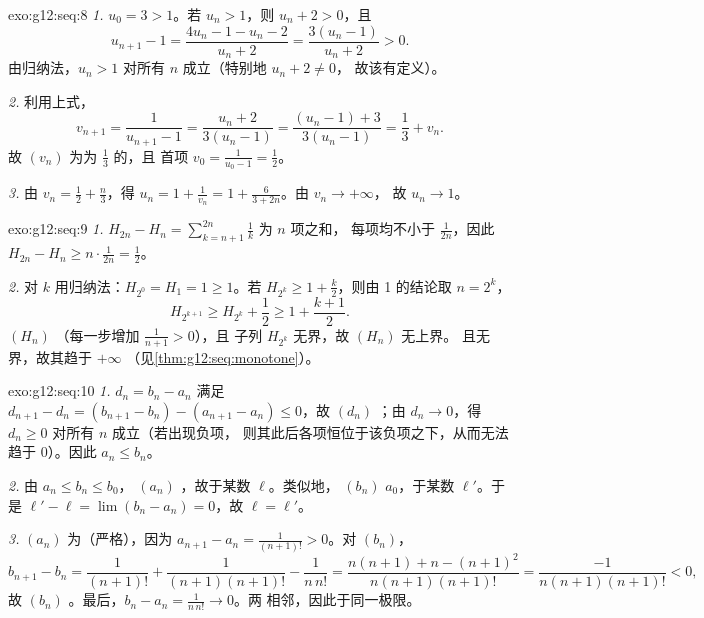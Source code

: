 \begin{solution}{exo:g12:seq:8}
\emph{1.} $u_0 = 3 > 1$。若 $u_n > 1$，则 $u_n + 2 > 0$，且
\[
u_{n+1} - 1 = \frac{4u_n - 1 - u_n - 2}{u_n + 2} = \frac{3(u_n - 1)}{u_n + 2} > 0 .
\]
由归纳法，$u_n > 1$ 对所有 $n$ 成立（特别地 $u_n + 2 \neq 0$，
故该有定义）。

\emph{2.} 利用上式，
\[
v_{n+1} = \frac{1}{u_{n+1} - 1} = \frac{u_n + 2}{3(u_n - 1)}
= \frac{(u_n - 1) + 3}{3(u_n - 1)} = \frac{1}{3} + v_n .
\]
故 $(v_n)$ 为为 $\frac13$ 的，且
首项 $v_0 = \frac{1}{u_0 - 1} = \frac12$。

\emph{3.} 由 $v_n = \frac12 + \frac{n}{3}$，得
$u_n = 1 + \frac{1}{v_n} = 1 + \frac{6}{3 + 2n}$。由 $v_n \to +\infty$，
故 $u_n \to 1$。
\end{solution}

\begin{solution}{exo:g12:seq:9}
\emph{1.} $H_{2n} - H_n = \sum_{k=n+1}^{2n} \frac{1}{k}$ 为 $n$ 项之和，
每项均不小于 $\frac{1}{2n}$，因此
$H_{2n} - H_n \geq n \cdot \frac{1}{2n} = \frac12$。

\emph{2.} 对 $k$ 用归纳法：$H_{2^0} = H_1 = 1 \geq 1$。若
$H_{2^k} \geq 1 + \frac{k}{2}$，则由 1 的结论取 $n = 2^k$，
\[
H_{2^{k+1}} \geq H_{2^k} + \frac12 \geq 1 + \frac{k+1}{2}.
\]
 $(H_n)$ （每一步增加 $\frac{1}{n+1} > 0$），且
子列 $H_{2^k}$ 无界，故 $(H_n)$ 无上界。
且无界，故其趋于 $+\infty$
（见\cref{thm:g12:seq:monotone}）。
\end{solution}

\begin{solution}{exo:g12:seq:10}
\emph{1.}  $d_n = b_n - a_n$ 满足
$d_{n+1} - d_n = (b_{n+1} - b_n) - (a_{n+1} - a_n) \leq 0$，故 $(d_n)$
；由 $d_n \to 0$，得 $d_n \geq 0$ 对所有 $n$ 成立（若出现负项，
则其此后各项恒位于该负项之下，从而无法
趋于 $0$）。因此 $a_n \leq b_n$。

\emph{2.} 由 $a_n \leq b_n \leq b_0$， $(a_n)$
，故于某数 $\ell$。类似地， $(b_n)$
 $a_0$，于某数 $\ell'$。于是
$\ell' - \ell = \lim (b_n - a_n) = 0$，故 $\ell = \ell'$。

\emph{3.} $(a_n)$ 为（严格），因为
$a_{n+1} - a_n = \frac{1}{(n+1)!} > 0$。对 $(b_n)$，
\[
b_{n+1} - b_n = \frac{1}{(n+1)!} + \frac{1}{(n+1)(n+1)!} - \frac{1}{n\,n!}
= \frac{n(n+1) + n - (n+1)^2}{n(n+1)(n+1)!}
= \frac{-1}{n(n+1)(n+1)!} < 0 ,
\]
故 $(b_n)$ 。最后，$b_n - a_n = \frac{1}{n\,n!} \to 0$。两
相邻，因此于同一极限。
\end{solution}

